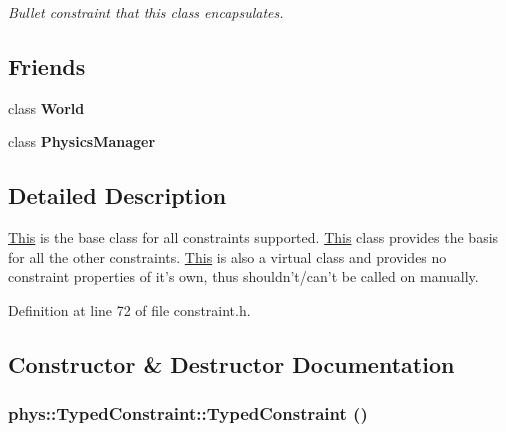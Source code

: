 \begin{DoxyCompactItemize}
\begin{DoxyCompactList}\small\item\em Bullet constraint that this class encapsulates. \item\end{DoxyCompactList}\end{DoxyCompactItemize}
\subsection*{Friends}
\begin{DoxyCompactItemize}
\item 
\hypertarget{classphys_1_1TypedConstraint_a7b4bcdf992c21ae83363f25df05b1d25}{
class {\bfseries World}}
\label{d1/d17/classphys_1_1TypedConstraint_a7b4bcdf992c21ae83363f25df05b1d25}

\item 
\hypertarget{classphys_1_1TypedConstraint_a139cf05ac01161b7071c8a037c841683}{
class {\bfseries PhysicsManager}}
\label{d1/d17/classphys_1_1TypedConstraint_a139cf05ac01161b7071c8a037c841683}

\end{DoxyCompactItemize}


\subsection{Detailed Description}
\hyperlink{structThis}{This} is the base class for all constraints supported. \hyperlink{structThis}{This} class provides the basis for all the other constraints. \hyperlink{structThis}{This} is also a virtual class and provides no constraint properties of it's own, thus shouldn't/can't be called on manually. 

Definition at line 72 of file constraint.h.



\subsection{Constructor \& Destructor Documentation}
\hypertarget{classphys_1_1TypedConstraint_a499e2f94ca4ee111001efa0dd3862391}{
\subsubsection[{TypedConstraint}]{\setlength{\rightskip}{0pt plus 5cm}phys::TypedConstraint::TypedConstraint ()}}
\label{d1/d17/classphys_1_1TypedConstraint_a499e2f94ca4ee111001efa0dd3862391}


